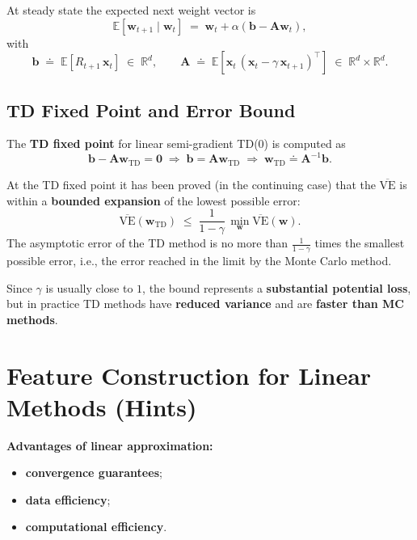 \documentclass[11pt,a4paper]{article}
\theoremstyle{definition}
\theoremstyle{plain}
\theoremstyle{remark}
\begin{document}
At steady state the expected next weight vector is
\[
    \mathbb{E}[\mathbf{w}_{t+1} \mid \mathbf{w}_t] \;=\; \mathbf{w}_t + \alpha (\mathbf{b} - \mathbf{A}\mathbf{w}_t),
\]
with
\[
    \mathbf{b} \;\doteq\; \mathbb{E}[R_{t+1}\, \mathbf{x}_t] \;\in\; \mathbb{R}^d, \qquad
    \mathbf{A} \;\doteq\; \mathbb{E}\!\left[\mathbf{x}_t\, (\mathbf{x}_t - \gamma\, \mathbf{x}_{t+1})^\top\right] \;\in\; \mathbb{R}^d \times \mathbb{R}^d.
\]

\subsection{TD Fixed Point and Error Bound}

The \textbf{TD fixed point} for linear semi-gradient TD(0) is computed as
\[
    \mathbf{b} - \mathbf{A}\mathbf{w}_{\mathrm{TD}} = \mathbf{0} \;\Rightarrow\; \mathbf{b} = \mathbf{A}\mathbf{w}_{\mathrm{TD}} \;\Rightarrow\; \mathbf{w}_{\mathrm{TD}} \doteq \mathbf{A}^{-1}\mathbf{b}.
\]

\begin{tcolorbox}[colback=red!5!white, colframe=red!70!black, title={Bound on the TD Fixed-Point Error}]
At the TD fixed point it has been proved (in the continuing case) that the $\overline{\mathrm{VE}}$ is within a \textbf{bounded expansion} of the lowest possible error:
\[
    \overline{\mathrm{VE}}(\mathbf{w}_{\mathrm{TD}}) \;\leq\; \frac{1}{1 - \gamma}\, \min_{\mathbf{w}} \overline{\mathrm{VE}}(\mathbf{w}).
\]
The asymptotic error of the TD method is no more than $\frac{1}{1 - \gamma}$ times the smallest possible error, i.e., the error reached in the limit by the Monte Carlo method.
\end{tcolorbox}

Since $\gamma$ is usually close to $1$, the bound represents a \textbf{substantial potential loss}, but in practice TD methods have \textbf{reduced variance} and are \textbf{faster than MC methods}.

\section{Feature Construction for Linear Methods (Hints)}

\textbf{Advantages of linear approximation:}
\begin{itemize}
    \item \textbf{convergence guarantees};
    \item \textbf{data efficiency};
    \item \textbf{computational efficiency}.
\end{itemize}
\end{document}
